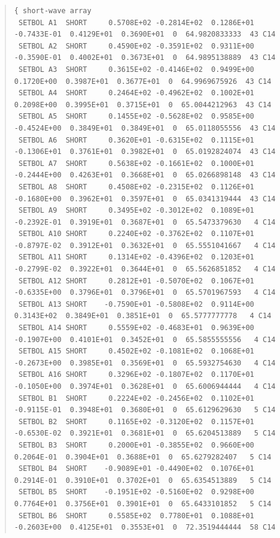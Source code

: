 \documentclass[twoside,11pt]{article}
\newenvironment{myquote}{\begin{quote}\begin{small}}{\end{small}\end{quote}}
\renewcommand{\_}{\texttt{\symbol{95}}}
\begin{document}
\begin{landscape}
\begin{myquote}
\begin{verbatim}
{ short-wave array
 SETBOL A1  SHORT     0.5708E+02 -0.2814E+02  0.1286E+01 -0.7433E-01  0.4129E+01  0.3690E+01  0  64.9820833333  43 C14
 SETBOL A2  SHORT     0.4590E+02 -0.3591E+02  0.9311E+00 -0.3590E-01  0.4002E+01  0.3673E+01  0  64.9895138889  43 C14
 SETBOL A3  SHORT     0.3615E+02 -0.4146E+02  0.9499E+00  0.1720E+00  0.3987E+01  0.3677E+01  0  64.9969675926  43 C14
 SETBOL A4  SHORT     0.2464E+02 -0.4962E+02  0.1002E+01  0.2098E+00  0.3995E+01  0.3715E+01  0  65.0044212963  43 C14
 SETBOL A5  SHORT     0.1455E+02 -0.5628E+02  0.9585E+00 -0.4524E+00  0.3849E+01  0.3849E+01  0  65.0118055556  43 C14
 SETBOL A6  SHORT     0.3620E+01 -0.6315E+02  0.1115E+01 -0.1306E+01  0.3761E+01  0.3982E+01  0  65.0192824074  43 C14
 SETBOL A7  SHORT     0.5638E+02 -0.1661E+02  0.1000E+01 -0.2444E+00  0.4263E+01  0.3668E+01  0  65.0266898148  43 C14
 SETBOL A8  SHORT     0.4508E+02 -0.2315E+02  0.1126E+01 -0.1680E+00  0.3962E+01  0.3597E+01  0  65.0341319444  43 C14
 SETBOL A9  SHORT     0.3495E+02 -0.3012E+02  0.1089E+01 -0.2392E-01  0.3919E+01  0.3687E+01  0  65.5473379630   4 C14
 SETBOL A10 SHORT     0.2240E+02 -0.3762E+02  0.1107E+01 -0.8797E-02  0.3912E+01  0.3632E+01  0  65.5551041667   4 C14
 SETBOL A11 SHORT     0.1314E+02 -0.4396E+02  0.1203E+01 -0.2799E-02  0.3922E+01  0.3644E+01  0  65.5626851852   4 C14
 SETBOL A12 SHORT     0.2812E+01 -0.5070E+02  0.1067E+01 -0.6335E+00  0.3796E+01  0.3796E+01  0  65.5701967593   4 C14
 SETBOL A13 SHORT    -0.7590E+01 -0.5808E+02  0.9114E+00  0.3143E+02  0.3849E+01  0.3851E+01  0  65.5777777778   4 C14
 SETBOL A14 SHORT     0.5559E+02 -0.4683E+01  0.9639E+00 -0.1907E+00  0.4101E+01  0.3452E+01  0  65.5855555556   4 C14
 SETBOL A15 SHORT     0.4502E+02 -0.1081E+02  0.1068E+01 -0.2673E+00  0.3985E+01  0.3569E+01  0  65.5932754630   4 C14
 SETBOL A16 SHORT     0.3296E+02 -0.1807E+02  0.1170E+01 -0.1050E+00  0.3974E+01  0.3628E+01  0  65.6006944444   4 C14
 SETBOL B1  SHORT     0.2224E+02 -0.2456E+02  0.1102E+01 -0.9115E-01  0.3948E+01  0.3680E+01  0  65.6129629630   5 C14
 SETBOL B2  SHORT     0.1165E+02 -0.3120E+02  0.1157E+01 -0.6530E-02  0.3921E+01  0.3681E+01  0  65.6204513889   5 C14
 SETBOL B3  SHORT     0.2000E+01 -0.3855E+02  0.9660E+00  0.2064E-01  0.3904E+01  0.3688E+01  0  65.6279282407   5 C14
 SETBOL B4  SHORT    -0.9089E+01 -0.4490E+02  0.1076E+01  0.2914E-01  0.3910E+01  0.3702E+01  0  65.6354513889   5 C14
 SETBOL B5  SHORT    -0.1951E+02 -0.5160E+02  0.9298E+00  0.7764E+01  0.3756E+01  0.3901E+01  0  65.6433101852   5 C14
 SETBOL B6  SHORT     0.5585E+02  0.7780E+01  0.1088E+01 -0.2603E+00  0.4125E+01  0.3553E+01  0  72.3519444444  58 C14

\end{verbatim}
\end{myquote}
\end{landscape}
\end{document}
